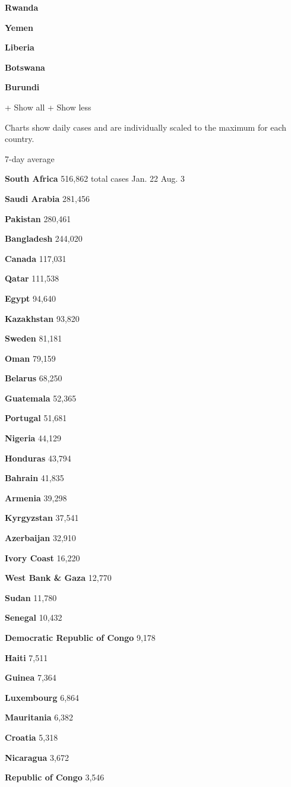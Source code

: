 \textbf{Rwanda}

\textbf{Yemen}

\textbf{Liberia}

\textbf{Botswana}

\textbf{Burundi}

+ Show all + Show less

Charts show daily cases and are individually scaled to the maximum for
each country.

7-day average

\textbf{South Africa} 516,862 total cases Jan. 22 Aug. 3

\textbf{Saudi Arabia} 281,456

\textbf{Pakistan} 280,461

\textbf{Bangladesh} 244,020

\textbf{Canada} 117,031

\textbf{Qatar} 111,538

\textbf{Egypt} 94,640

\textbf{Kazakhstan} 93,820

\textbf{Sweden} 81,181

\textbf{Oman} 79,159

\textbf{Belarus} 68,250

\textbf{Guatemala} 52,365

\textbf{Portugal} 51,681

\textbf{Nigeria} 44,129

\textbf{Honduras} 43,794

\textbf{Bahrain} 41,835

\textbf{Armenia} 39,298

\textbf{Kyrgyzstan} 37,541

\textbf{Azerbaijan} 32,910

\textbf{Ivory Coast} 16,220

\textbf{West Bank \& Gaza} 12,770

\textbf{Sudan} 11,780

\textbf{Senegal} 10,432

\textbf{Democratic Republic of Congo} 9,178

\textbf{Haiti} 7,511

\textbf{Guinea} 7,364

\textbf{Luxembourg} 6,864

\textbf{Mauritania} 6,382

\textbf{Croatia} 5,318

\textbf{Nicaragua} 3,672

\textbf{Republic of Congo} 3,546

